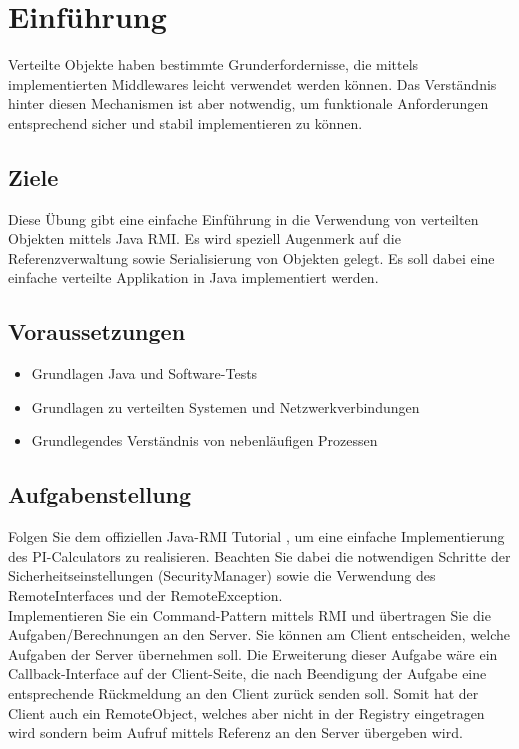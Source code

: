 
\section{Einführung}

Verteilte Objekte haben bestimmte Grunderfordernisse, die mittels implementierten Middlewares leicht verwendet werden können. Das Verständnis hinter diesen Mechanismen ist aber notwendig, um funktionale Anforderungen entsprechend sicher und stabil implementieren zu können.

\subsection{Ziele}

Diese Übung gibt eine einfache Einführung in die Verwendung von verteilten Objekten mittels Java RMI. Es wird speziell Augenmerk auf die Referenzverwaltung sowie Serialisierung von Objekten gelegt. Es soll dabei eine einfache verteilte Applikation in Java implementiert werden.

\subsection{Voraussetzungen}


\begin{itemize}
	\item Grundlagen Java und Software-Tests
    \item Grundlagen zu verteilten Systemen und Netzwerkverbindungen
    \item Grundlegendes Verständnis von nebenläufigen Prozessen
\end{itemize}

\subsection{Aufgabenstellung}

Folgen Sie dem offiziellen Java-RMI Tutorial \cite{javaRMI}, um eine einfache Implementierung des PI-Calculators zu realisieren. Beachten Sie dabei die notwendigen Schritte der Sicherheitseinstellungen (SecurityManager) sowie die Verwendung des RemoteInterfaces und der RemoteException.\\

Implementieren Sie ein Command-Pattern \cite{Command-Pattern} mittels RMI und übertragen Sie die Aufgaben/Berechnungen an den Server. Sie können am Client entscheiden, welche Aufgaben der Server übernehmen soll. Die Erweiterung dieser Aufgabe wäre ein Callback-Interface auf der Client-Seite, die nach Beendigung der Aufgabe eine entsprechende Rückmeldung an den Client zurück senden soll. Somit hat der Client auch ein RemoteObject, welches aber nicht in der Registry eingetragen wird sondern beim Aufruf mittels Referenz an den Server übergeben wird.
\clearpage
